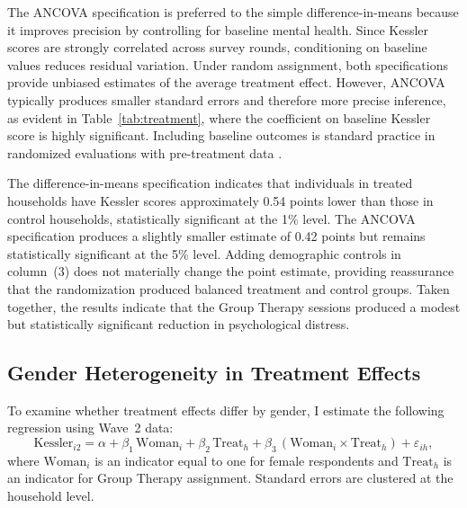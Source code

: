 \documentclass[12pt]{article}
\begin{document}
The ANCOVA specification is preferred to the simple difference-in-means because it improves precision by controlling for baseline mental health. Since Kessler scores are strongly correlated across survey rounds, conditioning on baseline values reduces residual variation. Under random assignment, both specifications provide unbiased estimates of the average treatment effect. However, ANCOVA typically produces smaller standard errors and therefore more precise inference, as evident in Table~\ref{tab:treatment}, where the coefficient on baseline Kessler score is highly significant. Including baseline outcomes is standard practice in randomized evaluations with pre-treatment data \citep{McKenzie2012, BruhnMcKenzie2009}.

The difference-in-means specification indicates that individuals in treated households have Kessler scores approximately 0.54 points lower than those in control households, statistically significant at the 1\% level. The ANCOVA specification produces a slightly smaller estimate of 0.42 points but remains statistically significant at the 5\% level. Adding demographic controls in column~(3) does not materially change the point estimate, providing reassurance that the randomization produced balanced treatment and control groups. Taken together, the results indicate that the Group Therapy sessions produced a modest but statistically significant reduction in psychological distress.


\subsection{Gender Heterogeneity in Treatment Effects}

To examine whether treatment effects differ by gender, I estimate the following regression using Wave~2 data:
\begin{equation}
\text{Kessler}_{i2} = \alpha + \beta_1 \, \text{Woman}_i + \beta_2 \, \text{Treat}_h + \beta_3 \, (\text{Woman}_i \times \text{Treat}_h) + \varepsilon_{ih},
\end{equation}
where $\text{Woman}_i$ is an indicator equal to one for female respondents and $\text{Treat}_h$ is an indicator for Group Therapy assignment. Standard errors are clustered at the household level.
\end{document}
